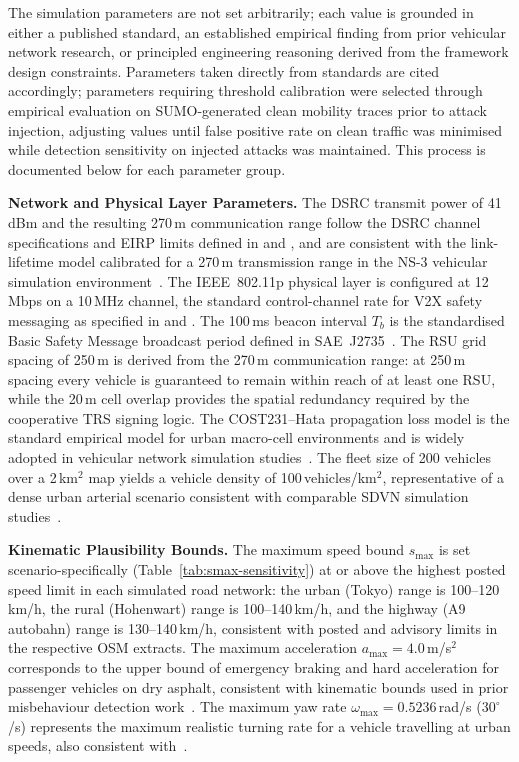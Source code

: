 \documentclass[12pt, a4paper]{report}
\begin{document}
The simulation parameters are not set arbitrarily; each value is
grounded in either a published standard, an established empirical
finding from prior vehicular network research, or principled
engineering reasoning derived from the framework design constraints.
Parameters taken directly from standards are cited accordingly;
parameters requiring threshold calibration were selected through
empirical evaluation on SUMO-generated clean mobility traces prior
to attack injection, adjusting values until false positive rate on
clean traffic was minimised while detection sensitivity on injected
attacks was maintained. This process is documented below for each
parameter group.

\textbf{Network and Physical Layer Parameters.}
The DSRC transmit power of 41\,dBm and the resulting 270\,m
communication range follow the DSRC channel specifications and
EIRP limits defined in \cite{ieee80211p2010} and \cite{fcc2004dsrc},
and are consistent with the link-lifetime model calibrated for a
270\,m transmission range in the NS-3 vehicular simulation
environment~\cite{kenney2011dedicated}. The IEEE~802.11p physical layer is configured at 12\,Mbps on a 10\,MHz
channel, the standard control-channel rate for V2X safety messaging
as specified in \cite{ieee80211p2010} and \cite{jiang2008ieee}. The
100\,ms beacon interval $T_b$ is the standardised Basic Safety
Message broadcast period defined in SAE~J2735~\cite{saej27352016}.
The RSU grid spacing of 250\,m is derived from the 270\,m
communication range: at 250\,m spacing every vehicle is guaranteed
to remain within reach of at least one RSU, while the 20\,m
cell overlap provides the spatial redundancy required by the
cooperative TRS signing logic. The COST231--Hata propagation loss
model is the standard empirical model for urban macro-cell
environments and is widely adopted in vehicular network simulation
studies~\cite{cost231hata}. The fleet size of 200 vehicles over a
2\,km$^2$ map yields a vehicle density of 100\,vehicles/km$^2$,
representative of a dense urban arterial scenario consistent with
comparable SDVN simulation studies~\cite{sommer2011}.

\textbf{Kinematic Plausibility Bounds.}
The maximum speed bound $s_{\max}$ is set scenario-specifically
(Table~\ref{tab:smax-sensitivity}) at or above the highest posted
speed limit in each simulated road network: the urban (Tokyo) range
is 100--120\,km/h, the rural (Hohenwart) range is 100--140\,km/h,
and the highway (A9 autobahn) range is 130--140\,km/h, consistent
with posted and advisory limits in the respective OSM extracts. The
maximum acceleration $a_{\max} = 4.0$\,m/s$^2$ corresponds to the
upper bound of emergency braking and hard acceleration for passenger
vehicles on dry asphalt, consistent with kinematic bounds used in
prior misbehaviour detection work~\cite{ghaleb2014}. The maximum
yaw rate $\omega_{\max} = 0.5236$\,rad/s ($30^\circ$/s) represents
the maximum realistic turning rate for a vehicle travelling at urban
speeds, also consistent with~\cite{ghaleb2014}.
\end{document}
